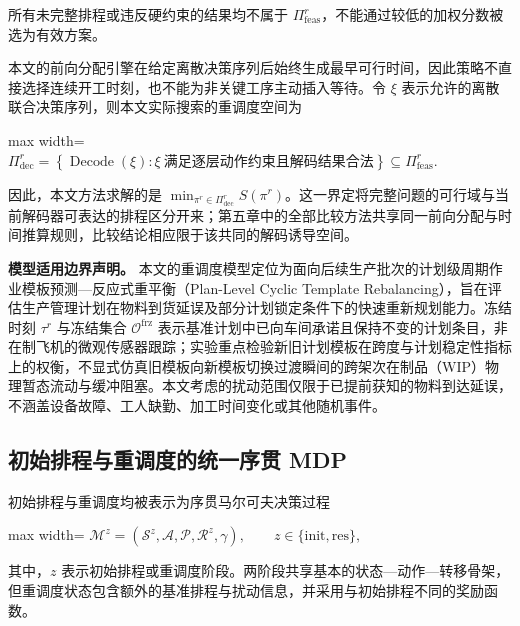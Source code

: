 \documentclass[journal,10pt]{IEEEtran}
\begin{document}
所有未完整排程或违反硬约束的结果均不属于 \(\Pi_{\mathrm{feas}}^r\)，不能通过较低的加权分数被选为有效方案。

本文的前向分配引擎在给定离散决策序列后始终生成最早可行时间，因此策略不直接选择连续开工时刻，也不能为非关键工序主动插入等待。令 \(\xi\) 表示允许的离散联合决策序列，则本文实际搜索的重调度空间为

\begin{center}
\begin{adjustbox}{max width=\columnwidth}
$\displaystyle
\Pi_{\mathrm{dec}}^r=
\left\{\operatorname{Decode}(\xi):
\xi\ \text{满足逐层动作约束且解码结果合法}\right\}
\subseteq\Pi_{\mathrm{feas}}^r.
$
\end{adjustbox}
\end{center}

因此，本文方法求解的是 \(\min_{\pi^r\in\Pi_{\mathrm{dec}}^r}S(\pi^r)\)。这一界定将完整问题的可行域与当前解码器可表达的排程区分开来；第五章中的全部比较方法共享同一前向分配与时间推算规则，比较结论相应限于该共同的解码诱导空间。

\textbf{模型适用边界声明。} 本文的重调度模型定位为面向后续生产批次的计划级周期作业模板预测—反应式重平衡（Plan-Level Cyclic Template Rebalancing），旨在评估生产管理计划在物料到货延误及部分计划锁定条件下的快速重新规划能力。冻结时刻 \(\tau^r\) 与冻结集合 \(\mathcal{O}^{\mathrm{frz}}\) 表示基准计划中已向车间承诺且保持不变的计划条目，非在制飞机的微观传感器跟踪；实验重点检验新旧计划模板在跨度与计划稳定性指标上的权衡，不显式仿真旧模板向新模板切换过渡瞬间的跨架次在制品（WIP）物理暂态流动与缓冲阻塞。本文考虑的扰动范围仅限于已提前获知的物料到达延误，不涵盖设备故障、工人缺勤、加工时间变化或其他随机事件。

\subsection{初始排程与重调度的统一序贯 MDP}\label{ux521dux59cbux6392ux7a0bux4e0eux91cdux8c03ux5ea6ux7684ux7edfux4e00ux5e8fux8d2f-mdp}

初始排程与重调度均被表示为序贯马尔可夫决策过程

\begin{center}
\begin{adjustbox}{max width=\columnwidth}
$\displaystyle
\mathcal{M}^{z}=\left(\mathcal{S}^{z},\mathcal{A},\mathcal{P},\mathcal{R}^{z},\gamma\right),
\qquad z\in\{\mathrm{init},\mathrm{res}\},
$
\end{adjustbox}
\end{center}

其中，\(z\) 表示初始排程或重调度阶段。两阶段共享基本的状态---动作---转移骨架，但重调度状态包含额外的基准排程与扰动信息，并采用与初始排程不同的奖励函数。
\end{document}
